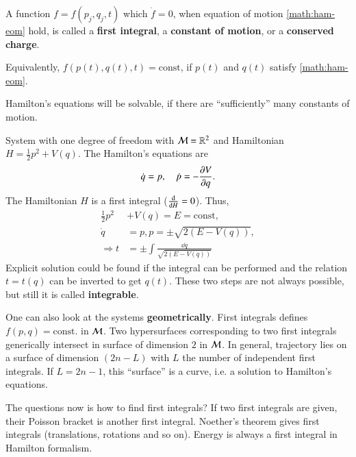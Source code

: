 \begin{definition}
	A function $f= f(p_j, q_j, t)$ which $\dot{f} = 0$, when equation of motion \eqref{math:ham-eom} hold, is called	a \textbf{first integral}, a \textbf{constant of motion}, or a \textbf{conserved charge}.
\end{definition}
Equivalently, $f(p(t), q(t), t) = \text{const}$, if $p(t)$ and $q(t)$ satisfy \eqref{math:ham-eom}.

Hamilton's equations will be solvable, if there are ``sufficiently'' many constants of motion.

\begin{example}
	System with one degree of freedom with $\mathcal{M} = \mathbb{R}^2$ and Hamiltonian $H = \frac{1}{2} p^2 + V(q)$. The Hamilton's equations are
	\begin{equation*}
		\dot{q} = p, \quad \dot{p} = - \pdv{V}{q}	.
	\end{equation*}
	The Hamiltonian $H$ is a first integral	 ($\dv{H} = 0$). Thus,
	\begin{align*}
		\frac{1}{2} p^2 &+ V(q) = E = \text{const} , \\
		\dot{q} &= p, p = \pm \sqrt{2(E-V(q))} , \\
		\Rightarrow t &= \pm \int \frac{\dd{q}}{\sqrt{2(E-V(q))}}
	\end{align*}
	Explicit solution could be found if the integral can be performed and the relation $t=t(q)$ can be inverted to get $q(t)$. These two steps are not always possible, but still it is called \textbf{integrable}.
\end{example}

One can also look at the systems \textbf{geometrically}. First integrals defines $f(p, q)=\text{const.}$ in $\mathcal{M}$. Two hypersurfaces corresponding to two first integrals generically intersect in surface of dimension $2$ in $\mathcal{M}$. In general, trajectory lies on a surface of dimension $(2n-L)$ with $L$ the number of independent first integrals. If $L=2n-1$, this ``surface'' is a curve, i.e. a solution to Hamilton's equations.

The questions now is how to find first integrals? If two first integrals are given, their Poisson bracket is another first integral. Noether's theorem gives first integrals (translations, rotations and so on). Energy is always a first integral in Hamilton formalism.

